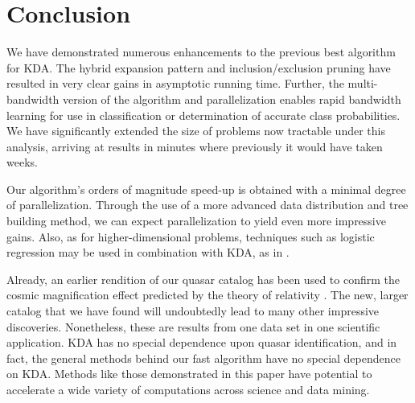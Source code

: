 \documentclass[twoside,leqno,twocolumn]{article}
\begin{document}
\section{Conclusion}
We have demonstrated numerous enhancements to the previous best
algorithm for KDA.  The hybrid expansion pattern and
inclusion/exclusion pruning have resulted in very clear gains in
asymptotic running time.  Further, the multi-bandwidth version of the
algorithm and parallelization enables rapid bandwidth learning for use
in classification or determination of accurate class probabilities.
We have significantly extended the size of problems now tractable
under this analysis, arriving at results in minutes where previously
it would have taken weeks.

Our algorithm's orders of magnitude speed-up is obtained with a
minimal degree of parallelization.  Through the use of a more advanced
data distribution and tree building method, we can expect
parallelization to yield even more impressive gains.  Also, as for
higher-dimensional problems, techniques such as logistic regression
may be used in combination with KDA, as in \cite{gray-highdimensional}.

Already, an earlier rendition of our quasar catalog has been used to
confirm the cosmic magnification effect predicted by the theory of
relativity \cite{nature05}.  The new, larger catalog that we have
found will undoubtedly lead to many other impressive discoveries.
Nonetheless, these are results from one data set in one scientific
application.  KDA has no special dependence upon quasar
identification, and in fact, the general methods \cite{nips2000paper}
behind our fast algorithm have no special dependence on KDA.  Methods
like those demonstrated in this paper have potential to accelerate a
wide variety of computations across science and data mining.
\end{document}
